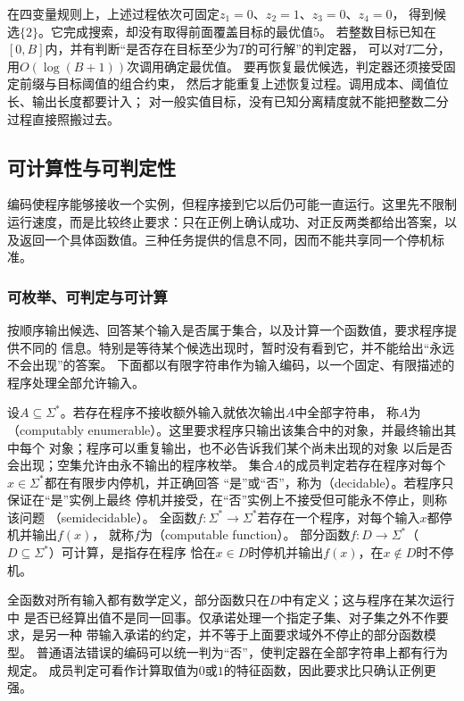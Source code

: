在四变量规则上，上述过程依次可固定$z_1=0$、$z_2=1$、$z_3=0$、$z_4=0$，
得到候选$\{2\}$。它完成搜索，却没有取得前面覆盖目标的最优值$5$。
若整数目标已知在$[0,B]$内，并有判断“是否存在目标至少为$T$的可行解”的判定器，
可以对$T$二分，用$O(\log(B+1))$次调用确定最优值。
要再恢复最优候选，判定器还须接受固定前缀与目标阈值的组合约束，
然后才能重复上述恢复过程。调用成本、阈值位长、输出长度都要计入；
对一般实值目标，没有已知分离精度就不能把整数二分过程直接照搬过去。

\subsection{可计算性与可判定性}
\label{sec:comb-computability}

编码使程序能够接收一个实例，但程序接到它以后仍可能一直运行。这里先不限制运行速度，而是比较终止要求：只在正例上确认成功、对正反两类都给出答案，以及返回一个具体函数值。三种任务提供的信息不同，因而不能共享同一个停机标准。

\subsubsection{可枚举、可判定与可计算}
\label{sec:comb-enumeration-decision}

按顺序输出候选、回答某个输入是否属于集合，以及计算一个函数值，要求程序提供不同的
信息。特别是等待某个候选出现时，暂时没有看到它，并不能给出“永远不会出现”的答案。
下面都以有限字符串作为输入编码，以一个固定、有限描述的程序处理全部允许输入。
\begin{definition}
\label{def:comb-computability}
设$A\subseteq\Sigma^\ast$。若存在程序不接收额外输入就依次输出$A$中全部字符串，
称$A$为
（computably enumerable）。这里要求程序只输出该集合中的对象，并最终输出其中每个
对象；程序可以重复输出，也不必告诉我们某个尚未出现的对象
以后是否会出现；空集允许由永不输出的程序枚举。
集合$A$的成员判定若存在程序对每个$x\in\Sigma^\ast$都在有限步内停机，并正确回答
“是”或“否”，称为（decidable）。若程序只保证在“是”实例上最终
停机并接受，在“否”实例上不接受但可能永不停止，则称该问题
（semidecidable）。
全函数$f:\Sigma^\ast\to\Sigma^\ast$若存在一个程序，对每个输入$x$都停机并输出$f(x)$，
就称$f$为（computable function）。
部分函数$f:D\to\Sigma^\ast$（$D\subseteq\Sigma^\ast$）可计算，是指存在程序
恰在$x\in D$时停机并输出$f(x)$，在$x\notin D$时不停机。
\end{definition}
全函数对所有输入都有数学定义，部分函数只在$D$中有定义；这与程序在某次运行中
是否已经算出值不是同一回事。仅承诺处理一个指定子集、对子集之外不作要求，是另一种
带输入承诺的约定，并不等于上面要求域外不停止的部分函数模型。
普通语法错误的编码可以统一判为“否”，使判定器在全部字符串上都有行为规定。
成员判定可看作计算取值为$0$或$1$的特征函数，因此要求比只确认正例更强。

